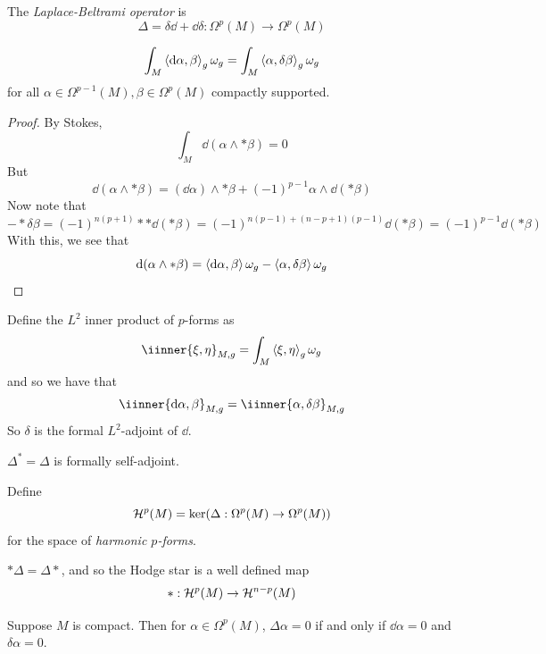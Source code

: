 \documentclass{article}
\begin{document}
\begin{definition}
     The \emph{Laplace-Beltrami operator} is
    \[\Delta = \delta\dd + \dd\delta : \Omega^p(M) \to \Omega^p(M)\]
\end{definition}

\begin{proposition}
    \[\int_M\left\langle \dd\alpha, \beta \right\rangle_g\omega_g = \int_M\left\langle \alpha, \delta\beta \right\rangle_g\omega_g\]
    for all \(\alpha \in \Omega^{p-1}(M), \beta \in \Omega^p(M)\) compactly supported.
\end{proposition}

\begin{proof}
    By Stokes,
    \[\int_M \dd(\alpha \wedge *\beta) = 0\]
    But
    \[\dd(\alpha \wedge *\beta) = (\dd\alpha) \wedge *\beta + (-1)^{p-1}\alpha \wedge \dd (*\beta)\]
    Now note that
    \[-*\delta\beta = (-1)^{n(p+1)}**\dd(*\beta) = (-1)^{n(p-1) + (n-p+1)(p-1)} \dd(*\beta) = (-1)^{p-1}\dd(*\beta)\]
    With this, we see that
    \[\dd(\alpha \wedge *\beta) = \left\langle \dd\alpha, \beta \right\rangle\omega_g - \left\langle \alpha, \delta\beta \right\rangle\omega_g\]
\end{proof}

\begin{remark}
    Define the \(L^2\) inner product of \(p\)-forms as
    \[\iinner{\xi, \eta}_{M, g} = \int_M \inner{\xi, \eta}_g\omega_g\]
    and so we have that
    \[\iinner{\dd\alpha, \beta}_{M, g} = \iinner{\alpha, \delta\beta}_{M, g}\]
    So \(\delta\) is the formal \(L^2\)-adjoint of \(\dd\).
\end{remark}

\begin{corollary}
    \(\Delta^* = \Delta\) is formally self-adjoint.
\end{corollary}

\lec

\begin{definition}
    [harmonic] Define
    \[\mathcal{H}^p(M) = \ker(\Delta : \Omega^p(M) \to \Omega^p(M))\]
    for the space of \emph{harmonic \(p\)-forms}.
\end{definition}

\begin{remark}
    \(*\Delta = \Delta*\), and so the Hodge star is a well defined map
    \[* : \mathcal{H}^p(M) \to \mathcal{H}^{n-p}(M)\]
\end{remark}

\begin{proposition}
    Suppose \(M\) is compact. Then for \(\alpha \in \Omega^p(M)\), \(\Delta\alpha = 0\) if and only if \(\dd\alpha = 0\) and \(\delta\alpha = 0\).
\end{proposition}
\end{document}
